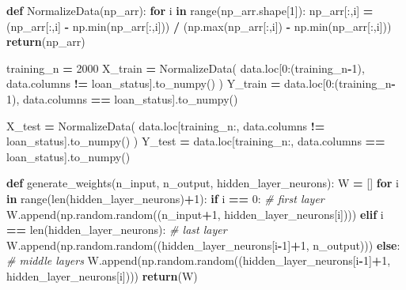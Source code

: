 \documentclass[
]{book}
\newenvironment{Shaded}{\begin{snugshade}}{\end{snugshade}}
\newcommand{\BuiltInTok}[1]{#1}
\newcommand{\CommentTok}[1]{\textcolor[rgb]{0.56,0.35,0.01}{\textit{#1}}}
\newcommand{\ControlFlowTok}[1]{\textcolor[rgb]{0.13,0.29,0.53}{\textbf{#1}}}
\newcommand{\DecValTok}[1]{\textcolor[rgb]{0.00,0.00,0.81}{#1}}
\newcommand{\KeywordTok}[1]{\textcolor[rgb]{0.13,0.29,0.53}{\textbf{#1}}}
\newcommand{\NormalTok}[1]{#1}
\newcommand{\OperatorTok}[1]{\textcolor[rgb]{0.81,0.36,0.00}{\textbf{#1}}}
\newcommand{\StringTok}[1]{\textcolor[rgb]{0.31,0.60,0.02}{#1}}
\begin{document}
\begin{Shaded}
\begin{Highlighting}[]
\KeywordTok{def}\NormalTok{ NormalizeData(np\_arr):}
  \ControlFlowTok{for}\NormalTok{ i }\KeywordTok{in} \BuiltInTok{range}\NormalTok{(np\_arr.shape[}\DecValTok{1}\NormalTok{]):}
\NormalTok{    np\_arr[:,i] }\OperatorTok{=}\NormalTok{ (np\_arr[:,i] }\OperatorTok{{-}}\NormalTok{ np.}\BuiltInTok{min}\NormalTok{(np\_arr[:,i])) }\OperatorTok{/}\NormalTok{ (np.}\BuiltInTok{max}\NormalTok{(np\_arr[:,i]) }\OperatorTok{{-}}\NormalTok{ np.}\BuiltInTok{min}\NormalTok{(np\_arr[:,i]))}
  \ControlFlowTok{return}\NormalTok{(np\_arr)}

\NormalTok{training\_n }\OperatorTok{=} \DecValTok{2000}
\NormalTok{X\_train }\OperatorTok{=}\NormalTok{ NormalizeData( data.loc[}\DecValTok{0}\NormalTok{:(training\_n}\OperatorTok{{-}}\DecValTok{1}\NormalTok{), data.columns }\OperatorTok{!=} \StringTok{\textquotesingle{}loan\_status\textquotesingle{}}\NormalTok{].to\_numpy() )}
\NormalTok{Y\_train }\OperatorTok{=}\NormalTok{ data.loc[}\DecValTok{0}\NormalTok{:(training\_n}\OperatorTok{{-}}\DecValTok{1}\NormalTok{), data.columns }\OperatorTok{==} \StringTok{\textquotesingle{}loan\_status\textquotesingle{}}\NormalTok{].to\_numpy()}

\NormalTok{X\_test }\OperatorTok{=}\NormalTok{ NormalizeData( data.loc[training\_n:, data.columns }\OperatorTok{!=} \StringTok{\textquotesingle{}loan\_status\textquotesingle{}}\NormalTok{].to\_numpy() )}
\NormalTok{Y\_test }\OperatorTok{=}\NormalTok{ data.loc[training\_n:, data.columns }\OperatorTok{==} \StringTok{\textquotesingle{}loan\_status\textquotesingle{}}\NormalTok{].to\_numpy()}


\KeywordTok{def}\NormalTok{ generate\_weights(n\_input, n\_output, hidden\_layer\_neurons):}
\NormalTok{  W }\OperatorTok{=}\NormalTok{ []}
  \ControlFlowTok{for}\NormalTok{ i }\KeywordTok{in} \BuiltInTok{range}\NormalTok{(}\BuiltInTok{len}\NormalTok{(hidden\_layer\_neurons)}\OperatorTok{+}\DecValTok{1}\NormalTok{):}
    \ControlFlowTok{if}\NormalTok{ i }\OperatorTok{==} \DecValTok{0}\NormalTok{: }\CommentTok{\# first layer}
\NormalTok{      W.append(np.random.random((n\_input}\OperatorTok{+}\DecValTok{1}\NormalTok{, hidden\_layer\_neurons[i])))}
    \ControlFlowTok{elif}\NormalTok{ i }\OperatorTok{==} \BuiltInTok{len}\NormalTok{(hidden\_layer\_neurons): }\CommentTok{\# last layer}
\NormalTok{      W.append(np.random.random((hidden\_layer\_neurons[i}\OperatorTok{{-}}\DecValTok{1}\NormalTok{]}\OperatorTok{+}\DecValTok{1}\NormalTok{, n\_output)))}
    \ControlFlowTok{else}\NormalTok{: }\CommentTok{\# middle layers}
\NormalTok{      W.append(np.random.random((hidden\_layer\_neurons[i}\OperatorTok{{-}}\DecValTok{1}\NormalTok{]}\OperatorTok{+}\DecValTok{1}\NormalTok{, hidden\_layer\_neurons[i])))}
  \ControlFlowTok{return}\NormalTok{(W)}


\end{Highlighting}
\end{Shaded}
\end{document}
